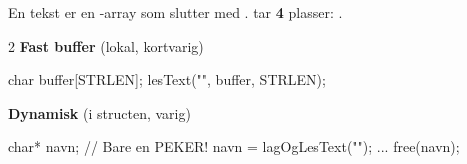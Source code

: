 

En tekst er en -array som slutter med .  tar \textbf{4} plasser: .

\begin{multicols}{2}
\textbf{Fast buffer} (lokal, kortvarig)
\begin{kode}
char buffer[STRLEN];
lesText("\tNavn", buffer, STRLEN);
\end{kode}
\columnbreak
\textbf{Dynamisk} (i structen, varig)
\begin{kode}
char* navn;                  //  Bare en PEKER!
navn = lagOgLesText("\tNavn");
...
free(navn);
\end{kode}
\end{multicols}


